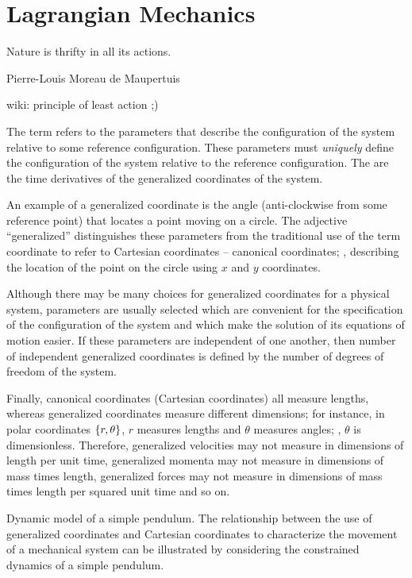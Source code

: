 \section{Lagrangian Mechanics}

\epigraph{Nature is thrifty in all its actions.}{Pierre-Louis Moreau de Maupertuis}{wiki: principle of least action ;)}

The term  refers to the parameters that describe the configuration of the system relative to some reference configuration. These parameters must \emph{uniquely} define the configuration of the system relative to the reference configuration. The  are the time derivatives of the generalized coordinates of the system.

An example of a generalized coordinate is the angle (anti-clockwise from some reference point) that locates a point moving on a circle. The adjective ``generalized'' distinguishes these parameters from the traditional use of the term coordinate to refer to Cartesian coordinates -- canonical coordinates; \eg, describing the location of the point on the circle using $x$ and $y$ coordinates.

Although there may be many choices for generalized coordinates for a physical system, parameters are usually selected which are convenient for the specification of the configuration of the system and which make the solution of its equations of motion easier. If these parameters are independent of one another, then number of independent generalized coordinates is defined by the number of degrees of freedom of the system.

Finally, canonical coordinates (Cartesian coordinates) all measure lengths, whereas generalized coordinates measure different dimensions; for instance, in polar coordinates $\left\lbrace{r, \theta}\right\rbrace$, $r$ measures lengths and $\theta$ measures angles; \ie, $\theta$ is dimensionless. Therefore, generalized velocities may not measure in dimensions of length per unit time, generalized momenta may not measure in dimensions of mass times length, generalized forces may not measure in dimensions of mass times length per squared unit time and so on.

\begin{example}
Dynamic model of a simple pendulum. The relationship between the use of generalized coordinates and Cartesian coordinates to characterize the movement of a mechanical system can be illustrated by considering the constrained dynamics of a simple pendulum.
\end{example}

